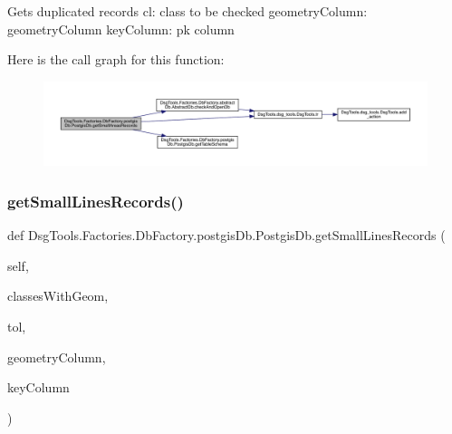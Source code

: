 \begin{DoxyVerb}Gets duplicated records
cl: class to be checked
geometryColumn: geometryColumn
keyColumn: pk column
\end{DoxyVerb}
 Here is the call graph for this function\+:
\nopagebreak
\begin{figure}[H]
\begin{center}
\leavevmode
\includegraphics[width=350pt]{class_dsg_tools_1_1_factories_1_1_db_factory_1_1postgis_db_1_1_postgis_db_aed401d01316e2d090c18bb9d184ddcc8_cgraph}
\end{center}
\end{figure}
\mbox{\label{class_dsg_tools_1_1_factories_1_1_db_factory_1_1postgis_db_1_1_postgis_db_ac61e0946b1f045ff03840a5bbb7bd339}} 
\subsubsection{\texorpdfstring{get\+Small\+Lines\+Records()}{getSmallLinesRecords()}}
{\footnotesize\ttfamily def Dsg\+Tools.\+Factories.\+Db\+Factory.\+postgis\+Db.\+Postgis\+Db.\+get\+Small\+Lines\+Records (\begin{DoxyParamCaption}\item[{}]{self,  }\item[{}]{classes\+With\+Geom,  }\item[{}]{tol,  }\item[{}]{geometry\+Column,  }\item[{}]{key\+Column }\end{DoxyParamCaption})}

